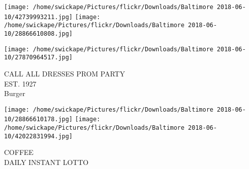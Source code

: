 \documentclass[10pt,letterpaper]{article}
\begin{document}
\texttt{[image: /home/swickape/Pictures/flickr/Downloads/Baltimore 2018-06-10/42739993211.jpg]}
\texttt{[image: /home/swickape/Pictures/flickr/Downloads/Baltimore 2018-06-10/28866610808.jpg]}

\vspace{0.25in}
\texttt{[image: /home/swickape/Pictures/flickr/Downloads/Baltimore 2018-06-10/27870964517.jpg]}

CALL ALL DRESSES PROM PARTY\\
EST. 1927\\
Burger
\pagebreak

\texttt{[image: /home/swickape/Pictures/flickr/Downloads/Baltimore 2018-06-10/28866610178.jpg]}
\texttt{[image: /home/swickape/Pictures/flickr/Downloads/Baltimore 2018-06-10/42022831994.jpg]}

COFFEE\\
DAILY INSTANT LOTTO
\pagebreak
\end{document}
